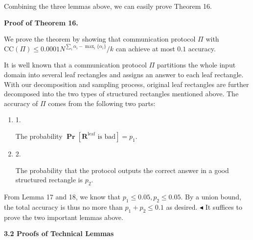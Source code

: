 Combining the three lemmas above, we can easily prove Theorem 16.\par




\par\medskip\noindent\textbf{Proof of Theorem 16.}\par




We prove the theorem by showing that communication protocol $\Pi$ with $\text{CC}(\Pi)\leq 0.0001N^{\sum_{i}{\alpha_{i}}-\mathop{\max}_{i}\{\alpha_{i}\}}/k$ can achieve at most $0.1$ accuracy.\par




It is well known that a communication protocol $\Pi$ partitions the whole input domain into several leaf rectangles and assigns an answer to each leaf rectangle. With our decomposition and sampling process, original leaf rectangles are further decomposed into the two types of structured rectangles mentioned above. The accuracy of $\Pi$ comes from the following two parts:\par


\begin{enumerate}


\item[] 
1. 


The probability $\operatorname*{\mathbf{Pr}}[\bm{R}^{\text{leaf}}\text{ is bad}]=p_{1}$.\par





\item[] 
2. 


The probability that the protocol outputs the correct answer in a good structured rectangle is $p_{2}$.\par





\end{enumerate}


From Lemma 17 and 18, we know that $p_{1}\leq 0.05,p_{2}\leq 0.05$. By a union bound, the total accuracy is thus no more than $p_{1}+p_{2}\leq 0.1$ as desired.
$\blacktriangleleft$
It suffices to prove the two important lemmas above.\par






\par\medskip\noindent\textbf{
3.2 Proofs of Technical Lemmas}\par




